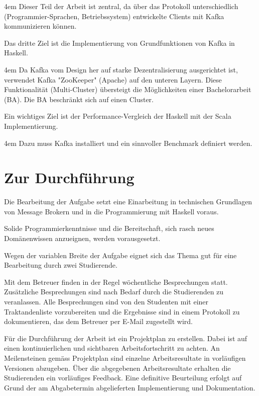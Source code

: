 \par
\begingroup
\leftskip4em
\rightskip\leftskip
Dieser Teil der Arbeit ist zentral, da über das Protokoll unterschiedlich
(Programmier-Sprachen, Betriebssystem) entwickelte Clients mit Kafka
kommunizieren können.
\par
\endgroup

Das dritte Ziel ist die Implementierung von Grundfunktionen von Kafka in
Haskell.

\par
\begingroup
\leftskip4em
\rightskip\leftskip
Da Kafka vom Design her auf starke Dezentralisierung ausgerichtet ist, verwendet
Kafka "ZooKeeper" (Apache) auf den unteren Layern. Diese Funktionalität
(Multi-Cluster) übersteigt die Möglichkeiten einer Bachelorarbeit (BA). Die BA
beschränkt sich auf einen Cluster.
\par
\endgroup

Ein wichtiges Ziel ist der Performance-Vergleich der Haskell mit der Scala
Implementierung.

\par
\begingroup
\leftskip4em
\rightskip\leftskip
Dazu muss Kafka installiert und ein sinnvoller Benchmark definiert werden.
\par
\endgroup

\section{Zur Durchführung}
Die Bearbeitung der Aufgabe setzt eine Einarbeitung in technischen Grundlagen
von Message Brokern und in die Programmierung mit Haskell  voraus.

Solide Programmierkenntnisse und die Bereitschaft, sich rasch neues
Domänenwissen anzueignen, werden vorausgesetzt. 

Wegen der variablen Breite der Aufgabe eignet sich das Thema gut für eine
Bearbeitung durch zwei Studierende. 

Mit dem Betreuer finden in der Regel wöchentliche Besprechungen statt.
Zusätzliche Besprechungen sind nach Bedarf durch die Studierenden zu
veranlassen. Alle Besprechungen sind von den Studenten mit einer Traktandenliste
vorzubereiten und die Ergebnisse sind in einem Protokoll zu dokumentieren, das
dem Betreuer per E-Mail zugestellt wird.

Für die Durchführung der Arbeit ist ein Projektplan zu erstellen. Dabei ist auf
einen kontinuierlichen und sichtbaren Arbeitsfortschritt zu achten. An
Meilensteinen gemäss Projektplan sind einzelne Arbeitsresultate in vorläufigen
Versionen abzugeben. Über die abgegebenen Arbeitsresultate erhalten die
Studierenden ein vorläufiges Feedback. Eine definitive Beurteilung erfolgt auf
Grund der am Abgabetermin abgelieferten Implementierung und Dokumentation. 


